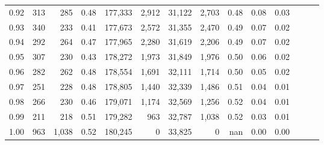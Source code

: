 \begin{tabular}{rrrrrrrrrrrrrr}
0.92 &    313 &    285 &  0.48 &  177,333 &    2,912 &  31,122 &   2,703 &  0.48 &  0.08 &      0.03 \\
0.93 &    340 &    233 &  0.41 &  177,673 &    2,572 &  31,355 &   2,470 &  0.49 &  0.07 &      0.02 \\
0.94 &    292 &    264 &  0.47 &  177,965 &    2,280 &  31,619 &   2,206 &  0.49 &  0.07 &      0.02 \\
0.95 &    307 &    230 &  0.43 &  178,272 &    1,973 &  31,849 &   1,976 &  0.50 &  0.06 &      0.02 \\
0.96 &    282 &    262 &  0.48 &  178,554 &    1,691 &  32,111 &   1,714 &  0.50 &  0.05 &      0.02 \\
0.97 &    251 &    228 &  0.48 &  178,805 &    1,440 &  32,339 &   1,486 &  0.51 &  0.04 &      0.01 \\
0.98 &    266 &    230 &  0.46 &  179,071 &    1,174 &  32,569 &   1,256 &  0.52 &  0.04 &      0.01 \\
0.99 &    211 &    218 &  0.51 &  179,282 &      963 &  32,787 &   1,038 &  0.52 &  0.03 &      0.01 \\
1.00 &    963 &  1,038 &  0.52 &  180,245 &        0 &  33,825 &       0 &   nan &  0.00 &      0.00 \\
\bottomrule
\end{tabular}
